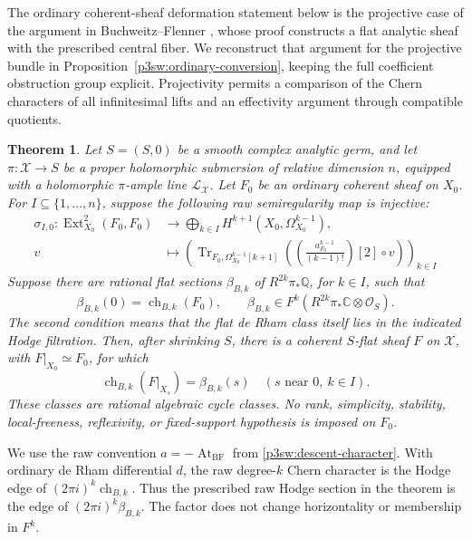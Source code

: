 \documentclass[11pt]{article}
\newcommand{\Q}{\mathbb Q}
\newcommand{\C}{\mathbb C}
\newtheorem{theorem}{Theorem}[section]
\numberwithin{equation}{section}
\begin{document}
The ordinary coherent-sheaf deformation statement below is the
projective case of the argument in Buchweitz--Flenner
\cite[Theorem~5.1 and its proof, pp.~174--179]{P3SWBuchweitzFlenner2003},
whose proof constructs a flat analytic sheaf with the prescribed central
fiber.  We reconstruct that argument for the projective bundle in
Proposition~\ref{p3sw:ordinary-conversion}, keeping the full coefficient
obstruction group explicit.  Projectivity permits a comparison of the
Chern characters of all infinitesimal lifts and an effectivity argument
through compatible quotients.

\begin{theorem}
\label{p3sw:projective-germ}
Let \(S=(S,0)\) be a smooth complex analytic germ, and let
\(\pi:\mathcal X\to S\) be a proper holomorphic submersion of relative
dimension \(n\), equipped with a holomorphic \(\pi\)-ample line
\(\mathcal L_{\mathcal X}\).  Let \(F_0\) be an ordinary coherent
sheaf on \(X_0\).  For \(I\subseteq\{1,\ldots,n\}\), suppose the following
raw semiregularity map is injective:
\begin{equation}
\label{p3sw:bf-seed-sigma}
 \begin{split}
 \sigma_{I,0}:\operatorname{Ext}^2_{X_0}(F_0,F_0)&\longrightarrow
       \bigoplus_{k\in I}H^{k+1}(X_0,\Omega_{X_0}^{k-1}),\\
 v&\longmapsto
       \left(\operatorname{Tr}_{F_0,\Omega_{X_0}^{k-1}[k+1]}
       \left(\left(\frac{a_{F_0}^{k-1}}{(k-1)!}\right)[2]\circ v\right)\right)_{k\in I}
 \end{split}
\end{equation}
Suppose there are rational flat sections
\(\beta_{B,k}\) of \(R^{2k}\pi_*\Q\), for \(k\in I\), such that
\[
 \beta_{B,k}(0)=\operatorname{ch}_{B,k}(F_0),\qquad
 \beta_{B,k}\in F^k(R^{2k}\pi_*\C\otimes\mathcal O_S).
\]
The second condition means that the flat de Rham class itself lies in
the indicated Hodge filtration.  Then, after shrinking \(S\), there
is a coherent \(S\)-flat sheaf \(F\) on \(\mathcal X\), with
\(F|_{X_0}\simeq F_0\), for which
\begin{equation}
\label{p3sw:bf-fiber-character}
 \operatorname{ch}_{B,k}(F|_{X_s})=\beta_{B,k}(s)
       \quad(s\text{ near }0,\ k\in I).
\end{equation}
These classes are rational algebraic cycle classes.  No rank,
simplicity, stability, local-freeness, reflexivity, or fixed-support
hypothesis is imposed on \(F_0\).
\end{theorem}

We use the raw convention \(a=-\operatorname{At}_{\mathrm{BF}}\)
from \eqref{p3sw:descent-character}.  With ordinary de Rham
differential \(d\), the raw degree-\(k\) Chern character is the Hodge
edge of \((2\pi i)^k\operatorname{ch}_{B,k}\).
Thus the prescribed raw Hodge section in the theorem is the edge
of \((2\pi i)^k\beta_{B,k}\).  The factor does not change
horizontality or membership in \(F^k\).
\end{document}
